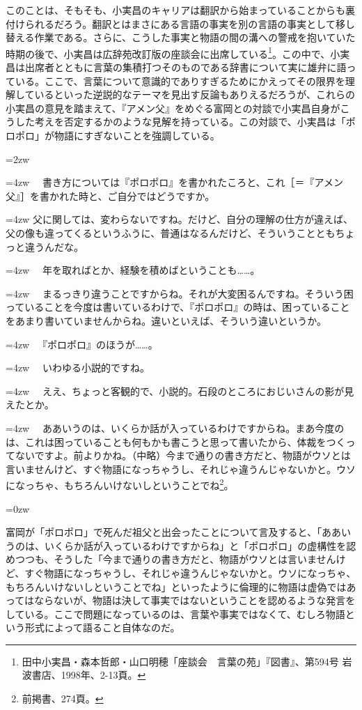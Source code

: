 このことは、そもそも、小実昌のキャリアは翻訳から始まっていることからも裏付けられるだろう。翻訳とはまさにある言語の事実を別の言語の事実として移し替える作業である。さらに、こうした事実と物語の間の溝への警戒を抱いていた時期の後で、小実昌は広辞苑改訂版の座談会に出席している\footnote{田中小実昌・森本哲郎・山口明穂「座談会　言葉の苑」『図書』、第594号 岩波書店、1998年、2-13頁。}。この中で、小実昌は出席者とともに言葉の集積打つそのものである辞書について実に雄弁に語っている。ここで、言葉について意識的でありすぎるためにかえってその限界を理解しているといった逆説的なテーマを見出す反論もありえるだろうが、これらの小実昌の意見を踏まえて、『アメン父』をめぐる富岡との対談で小実昌自身がこうした考えを否定するかのような見解を持っている。この対談で、小実昌は「ポロポロ」が物語にすぎないことを強調している。

\leftskip=2zw


  \hangindent=4zw  　書き方については『ポロポロ』を書かれたころと、これ［＝『アメン父』］を書かれた時と、ご自分ではどうですか。

  \hangindent=4zw  父に関しては、変わらないですね。だけど、自分の理解の仕方が違えば、父の像も違ってくるというふうに、普通はなるんだけど、そういうことともちょっと違うんだな。

 \hangindent=4zw 　年を取ればとか、経験を積めばということも……。

 \hangindent=4zw  　まるっきり違うことですからね。それが大変困るんですね。そういう困っていることを今度は書いているわけで、『ポロポロ』の時は、困っていることをあまり書いていませんからね。違いといえば、そういう違いというか。

 \hangindent=4zw 　『ポロポロ』のほうが……。

 \hangindent=4zw 　いわゆる小説的ですね。

 \hangindent=4zw 　ええ、ちょっと客観的で、小説的。石段のところにおじいさんの影が見えたとか。

 \hangindent=4zw 　ああいうのは、いくらか話が入っているわけですからね。まあ今度のは、これは困っていることも何もかも書こうと思って書いたから、体裁をつくってないですよ。前よりかね。（中略）今まで通りの書き方だと、物語がウソとは言いませんけど、すぐ物語になっちゃうし、それじゃ違うんじゃないかと。ウソになっちゃ、もちろんいけないしということでね\footnote{前掲書、274頁。}。 

\leftskip=0zw

富岡が「ポロポロ」で死んだ祖父と出会ったことについて言及すると、「ああいうのは、いくらか話が入っているわけですからね」と「ポロポロ」の虚構性を認めつつも、そうした「今まで通りの書き方だと、物語がウソとは言いませんけど、すぐ物語になっちゃうし、それじゃ違うんじゃないかと。ウソになっちゃ、もちろんいけないしということでね」といったように倫理的に物語は虚偽ではあってはならないが、物語は決して事実ではないということを認めるような発言をしている。ここで問題になっているのは、言葉や事実ではなくて、むしろ物語という形式によって語ること自体なのだ。

